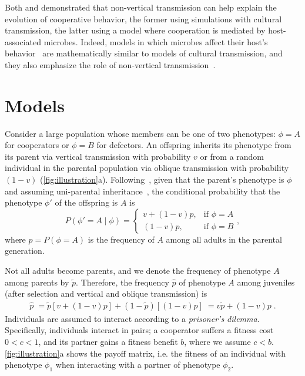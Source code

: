 \documentclass[12pt]{extarticle}
\begin{document}
Both \citet{woodcock2006significance} and \citet{lewin2017microbes} demonstrated that non-vertical transmission can help explain the evolution of cooperative behavior, the former using simulations with cultural transmission, the latter using a model where cooperation is mediated by host-associated microbes.
Indeed, models in which microbes affect their host's behavior~\citep{lewin2017microbes,lewin2020rockpaperscissors,gurevich2020parental} are mathematically similar to models of cultural transmission, and they also emphasize the role of non-vertical transmission~\citep{cavalli1981cultural}.
\newpage
\section{Models}

Consider a large population whose members can be one of two phenotypes: $\phi=A$ for cooperators or $\phi=B$ for defectors.
An offspring inherits its phenotype from its parent via vertical transmission with probability $v$ or from a random individual in the parental population via oblique transmission with probability $(1-v)$ (\autoref{fig:illustration}a). 
Following~\citet{ram2018evolution}, given that the parent's phenotype is $\phi$ and assuming uni-parental inheritance~\citep{Zefferman2016}, the conditional probability that the phenotype $\phi'$ of the offspring is $A$ is 
\begin{equation} \label{eq:vertical_oblique_transmission}
P(\phi'=A \mid \phi) = \begin{cases}
v + (1-v)p, & \text{if } \phi=A \\
(1-v)p, & \text{if } \phi=B
\end{cases},
\end{equation}
where $p=P(\phi=A)$ is the frequency of $A$ among all adults in the parental generation.  

Not all adults become parents, and we denote the frequency of phenotype $A$ among parents by $\tilde{p}$.
Therefore, the frequency $\hat{p}$ of  phenotype $A$ among juveniles (after selection and vertical and oblique transmission) is
\begin{equation}\label{eq:horizontal}
\begin{aligned}
\hat{p} \;=
\tilde{p} [v + (1-v)p] + (1-\tilde{p}) [(1-v)p] \;= 
v \tilde{p} + (1-v) p \;.
\end{aligned}
\end{equation}
Individuals are assumed to interact according to a \emph{prisoner's dilemma}.
Specifically, individuals interact in pairs; a cooperator suffers a fitness cost $0<c<1$, and its partner gains a fitness benefit $b$, where we assume $c<b$. \autoref{fig:illustration}a shows the payoff matrix, i.e. the fitness of an individual with phenotype $\phi_1$ when interacting with a partner of phenotype $\phi_2$.
\end{document}
